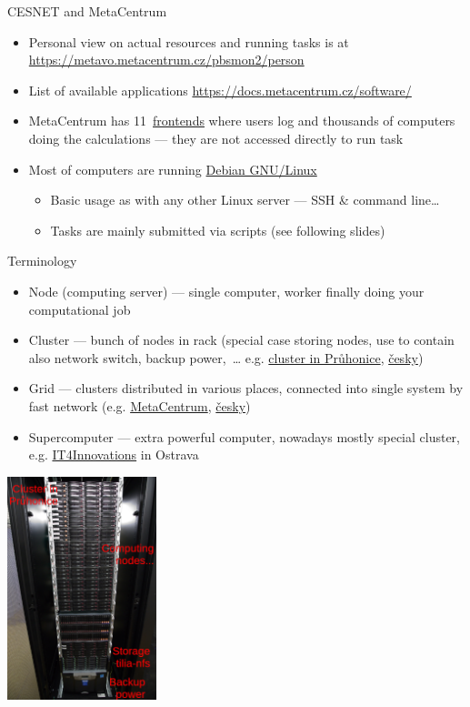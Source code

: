 \documentclass[compress, xelatex, 11pt, xcolor=svgnames, aspectratio=169,
	hyperref={
		bookmarks=true,
		unicode=true,
		colorlinks=true,
		pdftitle={Linux, command line and MetaCentrum},
		plainpages=false,
		pdfauthor={Vojtech Zeisek},
		pdfsubject={Course about use of Linux command line, writing shell scripts and using MetaCentrum of CESNET},
		pdfcreator={XeLaTeX},
		pdfkeywords={Linux, GNU, BASH, shell, command line, MetaCentrum},
		linkcolor=DarkRed, %
		anchorcolor=DarkBlue, %
		citecolor=Indigo, %
		filecolor=NavyBlue, %
		menucolor=DarkMagenta, %
		urlcolor=DarkBlue, %
		},
	url={hyphens, lowtilde} %
	]{beamer}
\begin{document}
\begin{frame}[allowframebreaks]{CESNET and MetaCentrum}
\begin{itemize}
		\item Personal view on actual resources and running tasks is at \url{https://metavo.metacentrum.cz/pbsmon2/person}
		\item List of available applications \url{https://docs.metacentrum.cz/software/}
		\item MetaCentrum has 11~\href{https://docs.metacentrum.cz/computing/frontends/}{frontends} where users log and thousands of computers doing the calculations --- they are not accessed directly to run task
		\item Most of computers are running \href{https://www.debian.org/}{Debian GNU/Linux}
		\begin{itemize}
			\item Basic usage as with any other Linux server --- SSH \& command line\ldots
			\item Tasks are mainly submitted via scripts (see following slides)
		\end{itemize}
	\end{itemize}
\end{frame}

\begin{frame}{Terminology}
	\begin{multicols}{2}
		\begin{itemize}
			\item Node (computing server) --- single computer, worker finally doing your computational job
			\item Cluster --- bunch of nodes in rack (special case storing nodes, use to contain also network switch, backup power,~\ldots{ } e.g. \href{https://sorbus.ibot.cas.cz/en/hw}{cluster in Průhonice}, \href{https://sorbus.ibot.cas.cz/cs/hw}{česky})
			\item Grid --- clusters distributed in various places, connected into single system by fast network (e.g. \href{https://www.metacentrum.cz/en/Sluzby/Grid/}{MetaCentrum}, \href{https://www.metacentrum.cz/cs/Sluzby/Grid/}{česky})
			\item Supercomputer --- extra powerful computer, nowadays mostly special cluster, e.g. \href{https://www.it4i.cz/}{IT4Innovations} in Ostrava
		\end{itemize}
		\begin{center}
			\includegraphics[height=6.5cm]{cluster_rack.jpg}
		\end{center}
	\end{multicols}
\end{frame}
\end{document}
